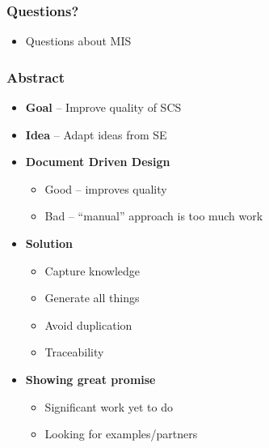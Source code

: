 \documentclass[t,12pt,numbers,fleqn]{beamer}
\begin{document}




\begin{frame}
\frametitle{Questions?}
\begin{itemize}
\item Questions about MIS
\end{itemize}
\end{frame}


\begin{frame}

\frametitle{Abstract}

\begin{itemize}
\item \textbf{Goal} -- Improve quality of SCS
\item \textbf{Idea} -- Adapt ideas from SE
\item \textbf{Document Driven Design}
\begin{itemize}
\item Good -- improves quality
\item Bad -- ``manual'' approach is too much work
\end{itemize}
\item \textbf{Solution}
\begin{itemize}
\item Capture knowledge
\item Generate all things
\item Avoid duplication
\item Traceability
\end{itemize}
\item \textbf{Showing great promise}
\begin{itemize}
\item Significant work yet to do
\item Looking for examples/partners
\end{itemize}
\end{itemize}

\end{frame}
\end{document}

